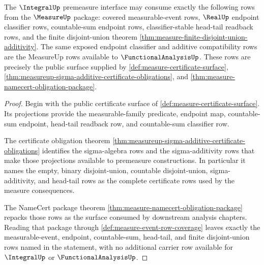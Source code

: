 \begin{theorem}
\label{thm:measure-integral-premeasure-consumption}
The $\IntegralUp$ premeasure interface may consume exactly the following rows
from the $\MeasureUp$ package: covered measurable-event rows, $\RealUp$
endpoint classifier rows, countable-sum endpoint rows, classifier-stable
head-tail readback rows, and the finite disjoint-union theorem
\autoref{thm:measure-finite-disjoint-union-additivity}. The same exposed
endpoint classifier and additive compatibility rows are the MeasureUp rows
available to $\FunctionalAnalysisUp$. These rows are precisely the public
surface supplied by \autoref{def:measure-certificate-surface},
\autoref{thm:measureup-sigma-additive-certificate-obligations}, and
\autoref{thm:measure-namecert-obligation-package}.
\end{theorem}
\begin{proof}
Begin with the public certificate surface of
\autoref{def:measure-certificate-surface}. Its projections provide the
measurable-family predicate, endpoint map, countable-sum endpoint, head-tail
readback row, and countable-sum classifier row.

The certificate obligation theorem
\autoref{thm:measureup-sigma-additive-certificate-obligations} identifies the
sigma-algebra rows and the sigma-additivity rows that make those projections
available to premeasure constructions. In particular it names the empty,
binary disjoint-union, countable disjoint-union, sigma-additivity, and
head-tail rows as the complete certificate rows used by the measure
consequences.

The NameCert package theorem
\autoref{thm:measure-namecert-obligation-package} repacks those rows as the
surface consumed by downstream analysis chapters. Reading that package through
\autoref{def:measure-event-row-coverage} leaves exactly the measurable-event,
endpoint, countable-sum, head-tail, and finite disjoint-union rows named in
the statement, with no additional carrier row available for $\IntegralUp$ or
$\FunctionalAnalysisUp$.
\end{proof}
